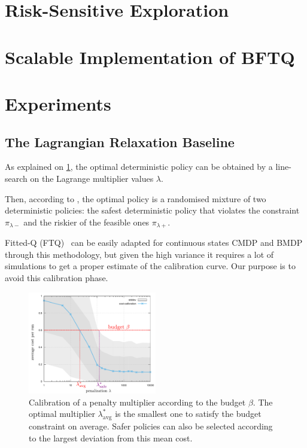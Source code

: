 \section{Risk-Sensitive Exploration}



\section{Scalable Implementation of BFTQ}
\label{sec:bftq-full}



\section{Experiments}

\subsection{The Lagrangian Relaxation Baseline}

As explained on \cref{fig:Lagrangian}, the optimal deterministic policy can be obtained by a line-search on the Lagrange multiplier values $\lambda$.

Then, according to \citet[Theorem 4.4]{BEUTLER1985236}, the optimal policy is a randomised mixture of two deterministic policies: the safest deterministic policy that violates the constraint $\pi_{\lambda-}$ and the riskier of the feasible ones $\pi_{\lambda+}$.

Fitted-Q (FTQ)~\citep{Ernst2005,Riedmiller2005} can be easily adapted for continuous states CMDP and BMDP through this methodology, but given the high variance it requires a lot of simulations to get a proper estimate of the calibration curve. Our purpose is to avoid this calibration phase.

\begin{figure}[tp]
    \centering
    \includegraphics[width=0.5\textwidth]{source/img/CalibrationExample}
    \caption{Calibration of a penalty multiplier according to the budget $\beta$. The optimal multiplier $\lambda^*_{\text{avg}}$ is the smallest one to satisfy the budget constraint on average. Safer policies can also be selected according to the largest deviation from this mean cost.}
    \label{fig:Lagrangian}
\end{figure}

